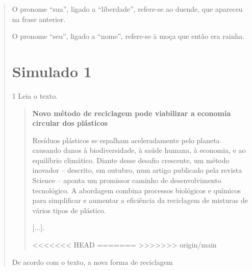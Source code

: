 \begin{quote}
\begin{escolha}
\item O pronome “sua”, ligado a “liberdade”, refere-se ao duende, que apareceu na frase anterior.

\item O pronome “seu”, ligado a “nome”, refere-se à moça que então era rainha.
\end{escolha}


\chapter{Simulado 1}

\num{1} Leia o texto.

\begin{quote}
\textbf{Novo método de reciclagem pode viabilizar a economia circular dos plásticos}

Resíduos plásticos se espalham aceleradamente pelo planeta causando
danos à biodiversidade, à saúde humana, à economia, e ao equilíbrio
climático. Diante desse desafio crescente, um método inovador --
descrito, em outubro, num artigo publicado pela revista Science --
aponta um promissor caminho de desenvolvimento tecnológico. A abordagem
combina processos biológicos e químicos para simplificar e aumentar a
eficiência da reciclagem de misturas de vários tipos de plástico.

{[}...{]}.

<<<<<<< HEAD
=======
>>>>>>> origin/main
\end{quote}

De acordo com o texto, a nova forma de reciclagem


\end{quote}
